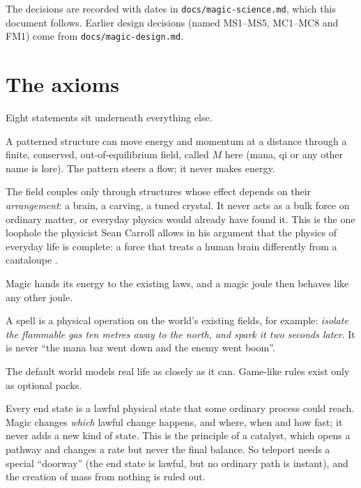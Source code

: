 \documentclass[11pt,a4paper]{article}
\begin{document}
{\sloppy The decisions are recorded with dates in \texttt{docs/magic-science.md}, which this document follows. Earlier design decisions (named MS1--MS5, MC1--MC8 and FM1) come from \texttt{docs/magic-design.md}.\par}

\section{The axioms}

Eight statements sit underneath everything else.

\begin{description}[style=nextline,leftmargin=1.2em]
  \item[A1. The One Change.] A patterned structure can move energy and momentum at a distance through a finite, conserved, out-of-equilibrium field, called $M$ here (mana, qi or any other name is lore). The pattern steers a flow; it never makes energy.
  \item[A2. Arrangement, not bulk.] The field couples only through structures whose effect depends on their \emph{arrangement}: a brain, a carving, a tuned crystal. It never acts as a bulk force on ordinary matter, or everyday physics would already have found it. This is the one loophole the physicist Sean Carroll allows in his argument that the physics of everyday life is complete: a force that treats a human brain differently from a cantaloupe \cite{carroll}.
  \item[A3. Every joule booked.] Magic hands its energy to the existing laws, and a magic joule then behaves like any other joule.
  \item[A4. A spell is a mechanism.] A spell is a physical operation on the world's existing fields, for example: \emph{isolate the flammable gas ten metres away to the north, and spark it two seconds later}. It is never ``the mana bar went down and the enemy went boom''.
  \item[A5. Realism by default.] The default world models real life as closely as it can. Game-like rules exist only as optional packs.
  \item[A6. Magic only allows change that could exist without it.] Every end state is a lawful physical state that some ordinary process could reach. Magic changes \emph{which} lawful change happens, and where, when and how fast; it never adds a new kind of state. This is the principle of a catalyst, which opens a pathway and changes a rate but never the final balance. So teleport needs a special ``doorway'' (the end state is lawful, but no ordinary path is instant), and the creation of mass from nothing is ruled out.

\end{description}
\end{document}
